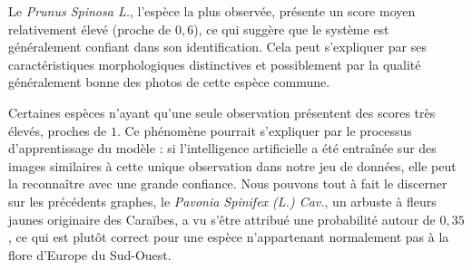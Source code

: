 \documentclass[a4paper,12pt]{article}
\begin{document}
\vspace{0.2cm}

Le \textit{Prunus Spinosa L.}, l'espèce la plus observée, présente un score moyen relativement élevé (proche de $0,6$), ce qui suggère que le système est généralement confiant dans son identification. Cela peut s'expliquer par ses caractéristiques morphologiques distinctives et possiblement par la qualité généralement bonne des photos de cette espèce commune.

\vspace{0.2cm}

Certaines espèces n'ayant qu'une seule observation présentent des scores très élevés, proches de $1$. Ce phénomène pourrait s'expliquer par le processus d'apprentissage du modèle : si l'intelligence artificielle a été entraînée sur des images similaires à cette unique observation dans notre jeu de données, elle peut la reconnaître avec une grande confiance. Nous pouvons tout à fait le discerner sur les précédents graphes, le \textit{Pavonia Spinifex (L.) Cav.}, un arbuste à fleurs jaunes originaire des Caraïbes, a vu s'être attribué une probabilité autour de $0,35$, ce qui est plutôt correct pour une espèce n'appartenant normalement pas à la flore d'Europe du Sud-Ouest.

\end{document}
